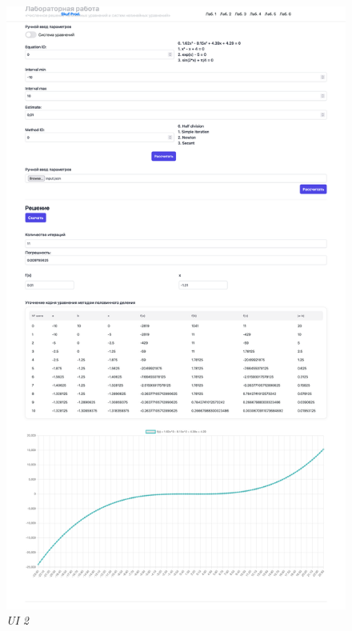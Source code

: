 \documentclass{article}
\begin{document}
            \begin{figure}[H] 
                  \begin{center}  
                        \includegraphics[scale=0.1]{SS2.png}
                        \caption{\small \sl UI 2}  
                  \end{center}  
            \end{figure}
\end{document}
